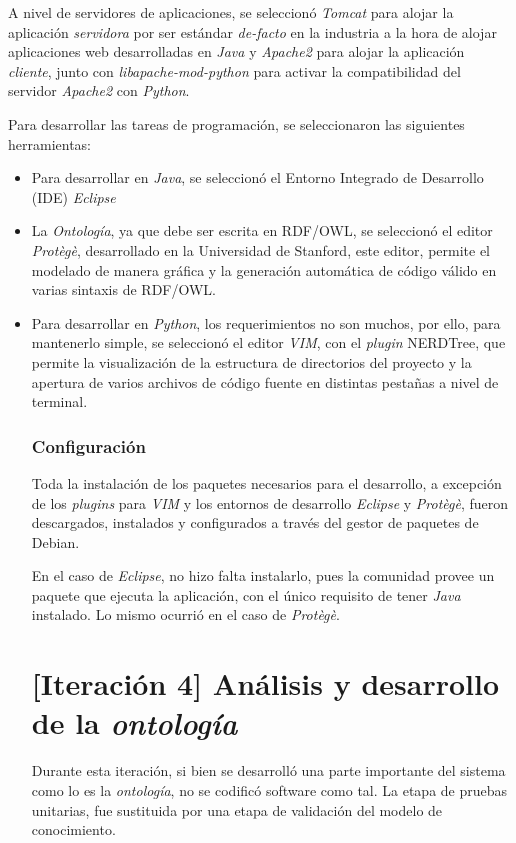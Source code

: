 A nivel de servidores de aplicaciones, se seleccionó \textit{Tomcat} para alojar la aplicación \textit{servidora} por ser estándar \textit{de-facto} en la industria a la hora de alojar aplicaciones web desarrolladas en \textit{Java} y \textit{Apache2} para alojar la aplicación \textit{cliente}, junto con \textit{libapache-mod-python} para activar la compatibilidad del servidor \textit{Apache2} con \textit{Python}.

Para desarrollar las tareas de programación, se seleccionaron las siguientes herramientas:
\begin{itemize}
    \item Para desarrollar en \textit{Java}, se seleccionó el Entorno Integrado de Desarrollo (IDE) \textit{Eclipse}
    \item La \textit{Ontología}, ya que debe ser escrita en RDF/OWL, se seleccionó el editor \textit{Protègè}, desarrollado en la Universidad de Stanford, este editor, permite el modelado de manera gráfica y la generación automática de código válido en varias sintaxis de RDF/OWL.
    \item Para desarrollar en \textit{Python}, los requerimientos no son muchos, por ello, para mantenerlo simple, se seleccionó el editor \textit{VIM}, con el \textit{plugin} NERDTree, que permite la visualización de la estructura de directorios del proyecto y la apertura de varios archivos de código fuente en distintas pestañas a nivel de terminal.

\subsubsection{Configuración}
Toda la instalación de los paquetes necesarios para el desarrollo, a excepción de los \textit{plugins} para \textit{VIM} y los entornos de desarrollo \textit{Eclipse} y \textit{Protègè}, fueron descargados, instalados y configurados a través del gestor de paquetes de Debian.

En el caso de \textit{Eclipse}, no hizo falta instalarlo, pues la comunidad provee un paquete que ejecuta la aplicación, con el único requisito de tener \textit{Java} instalado. Lo mismo ocurrió en el caso de \textit{Protègè}.

\section{[Iteración 4] Análisis y desarrollo de la \textit{ontología}}
Durante esta iteración, si bien se desarrolló una parte importante del sistema como lo es la \textit{ontología}, no se codificó software como tal. La etapa de pruebas unitarias, fue sustituida por una etapa de validación del modelo de conocimiento.


\end{itemize}
